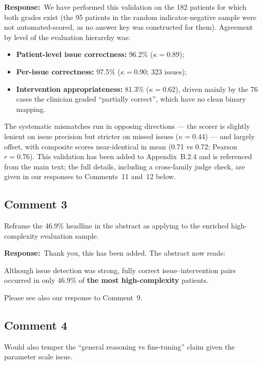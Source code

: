 \documentclass[11pt,a4paper]{article}
\newcounter{rcomment}
\newcommand{\response}{\noindent\textbf{Response:}\ }
\begin{document}
\response We have performed this validation on the 182 patients for which both grades exist (the 95 patients in the random indicator-negative sample were not automated-scored, as no answer key was constructed for them). Agreement by level of the evaluation hierarchy was:

\begin{itemize}[leftmargin=2em, itemsep=0.1em]
  \item \textbf{Patient-level issue correctness:} 96.2\% ($\kappa = 0.89$);
  \item \textbf{Per-issue correctness:} 97.5\% ($\kappa = 0.90$; 323 issues);
  \item \textbf{Intervention appropriateness:} 81.3\% ($\kappa = 0.62$), driven mainly by the 76 cases the clinician graded ``partially correct'', which have no clean binary mapping.
\end{itemize}

The systematic mismatches run in opposing directions --- the scorer is slightly lenient on issue precision but stricter on missed issues ($\kappa = 0.44$) --- and largely offset, with composite scores near-identical in mean (0.71 vs 0.72; Pearson $r = 0.76$). This validation has been added to Appendix~B.2.4 and is referenced from the main text; the full details, including a cross-family judge check, are given in our responses to Comments~11 and~12 below.

\subsection*{Comment 3}
\begin{reviewercomment}
Reframe the 46.9\% headline in the abstract as applying to the enriched high-complexity evaluation sample.
\end{reviewercomment}

\response Thank you, this has been added. The abstract now reads:

\begin{manuscriptchange}[Abstract]
Although issue detection was strong, fully correct issue--intervention pairs occurred in only 46.9\% of \textbf{the most high-complexity} patients.
\end{manuscriptchange}

Please see also our response to Comment~9.

\subsection*{Comment 4}
\begin{reviewercomment}
Would also temper the ``general reasoning vs fine-tuning'' claim given the parameter scale issue.
\end{reviewercomment}
\end{document}
